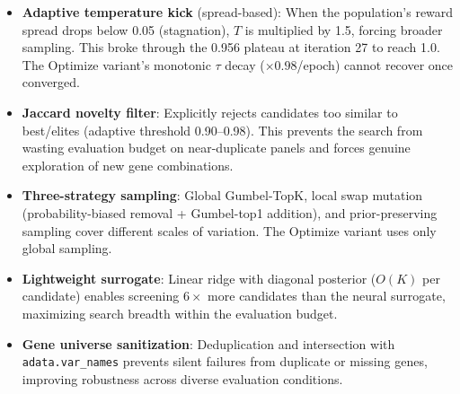 \documentclass[8pt]{article}
\begin{document}
\begin{tcolorbox}[
    title={\textbf{Explore Best}: Superior search escape $\to$ higher final score (1.0)},
    colback=lightgreen!10, colframe=added!60, fonttitle=\small\bfseries,
    boxrule=0.5pt, arc=2pt, left=6pt, right=6pt, top=3pt, bottom=3pt
]
\small
\begin{itemize}[leftmargin=1em, itemsep=2pt]
    \item \textbf{Adaptive temperature kick} (spread-based): When the population's reward spread drops below 0.05 (stagnation), $T$ is multiplied by 1.5, forcing broader sampling. This broke through the 0.956 plateau at iteration 27 to reach 1.0. The Optimize variant's monotonic $\tau$ decay ($\times 0.98$/epoch) cannot recover once converged.

    \item \textbf{Jaccard novelty filter}: Explicitly rejects candidates too similar to best/elites (adaptive threshold 0.90--0.98). This prevents the search from wasting evaluation budget on near-duplicate panels and forces genuine exploration of new gene combinations.

    \item \textbf{Three-strategy sampling}: Global Gumbel-TopK, local swap mutation (probability-biased removal + Gumbel-top1 addition), and prior-preserving sampling cover different scales of variation. The Optimize variant uses only global sampling.

    \item \textbf{Lightweight surrogate}: Linear ridge with diagonal posterior ($O(K)$ per candidate) enables screening $6\times$ more candidates than the neural surrogate, maximizing search breadth within the evaluation budget.

    \item \textbf{Gene universe sanitization}: Deduplication and intersection with \texttt{adata.var\_names} prevents silent failures from duplicate or missing genes, improving robustness across diverse evaluation conditions.
\end{itemize}
\end{tcolorbox}

\vspace{4pt}
\end{document}
